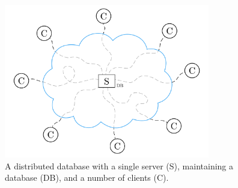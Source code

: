 \begin{figure}
  \centering
  \includegraphics[width=0.8\textwidth]{include/assets/single-server.pdf}
  \caption{A distributed database with a single server (S), maintaining a database (DB), and a number of clients (C).}
\end{figure}
